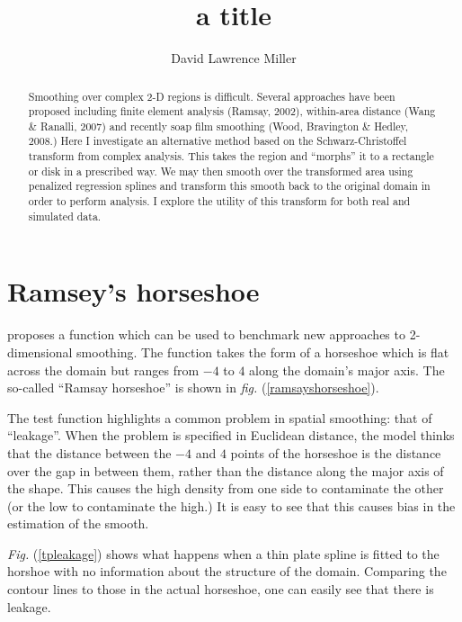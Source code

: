 \documentclass[a4paper,10pt]{amsart}
\title{a title}
\author{David Lawrence Miller}
\newcommand{\fig}[1]{\emph{fig.} (\ref{#1})}
\newcommand{\Fig}[1]{\emph{Fig.} (\ref{#1})}
\begin{document}
\begin{abstract}
Smoothing over complex 2-D regions is difficult. Several approaches have been proposed including finite element analysis (Ramsay, 2002), within-area distance (Wang \& Ranalli, 2007) and recently soap film smoothing (Wood, Bravington \& Hedley, 2008.) Here I investigate an alternative method based on the Schwarz-Christoffel transform from complex analysis. This takes the region and ``morphs'' it to a rectangle or disk in a prescribed way. We may then smooth over the transformed area using penalized regression splines and transform this smooth back to the original domain in order to perform analysis. I explore the utility of this transform for both real and simulated data.
\end{abstract}


\newtheorem{thm}{Theorem}[section]

\newtheorem{defn}{Definition}[section]

\maketitle



\section{Ramsey's horseshoe}

\cite{ramsay} proposes a function which can be used to benchmark new approaches to 2-dimensional smoothing. The function takes the form of a horseshoe which is flat across the domain but ranges from $-4$ to $4$ along the domain's major axis. The so-called ``Ramsay horseshoe'' is shown in \fig{ramsayshorseshoe}.

The test function highlights a common problem in spatial smoothing: that of ``leakage''. When the problem is specified in Euclidean distance, the model thinks that the distance between the $-4$ and $4$ points of the horseshoe is the distance over the gap in between them, rather than the distance along the major axis of the shape. This causes the high density from one side to contaminate the other (or the low to contaminate the high.) It is easy to see that this causes bias in the estimation of the smooth.

\Fig{tpleakage} shows what happens when a thin plate spline is fitted to the horshoe with no information about the structure of the domain. Comparing the contour lines to those in the actual horseshoe, one can easily see that there is leakage.
\end{document}
